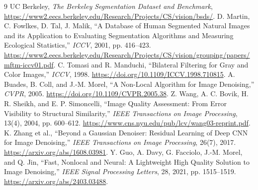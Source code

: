 \documentclass[11pt,a4paper]{article}
\begin{document}
\begin{thebibliography}{9}
\small\setlength{\itemsep}{0pt}\setlength{\parsep}{0pt}
 UC Berkeley, \emph{The Berkeley Segmentation Dataset and Benchmark}, \url{https://www2.eecs.berkeley.edu/Research/Projects/CS/vision/bsds/}.
 D. Martin, C. Fowlkes, D. Tal, J. Malik, ``A Database of Human Segmented Natural Images and its Application to Evaluating Segmentation Algorithms and Measuring Ecological Statistics,'' \emph{ICCV}, 2001, pp. 416--423. \url{https://www2.eecs.berkeley.edu/Research/Projects/CS/vision/grouping/papers/mftm-iccv01.pdf}.
 C. Tomasi and R. Manduchi, ``Bilateral Filtering for Gray and Color Images,'' \emph{ICCV}, 1998. \url{https://doi.org/10.1109/ICCV.1998.710815}.
 A. Buades, B. Coll, and J.-M. Morel, ``A Non-Local Algorithm for Image Denoising,'' \emph{CVPR}, 2005. \url{https://doi.org/10.1109/CVPR.2005.38}.
 Z. Wang, A. C. Bovik, H. R. Sheikh, and E. P. Simoncelli, ``Image Quality Assessment: From Error Visibility to Structural Similarity,'' \emph{IEEE Transactions on Image Processing}, 13(4), 2004, pp. 600--612. \url{https://www.cns.nyu.edu/pub/lcv/wang03-reprint.pdf}.
 K. Zhang et al., ``Beyond a Gaussian Denoiser: Residual Learning of Deep CNN for Image Denoising,'' \emph{IEEE Transactions on Image Processing}, 26(7), 2017. \url{https://arxiv.org/abs/1608.03981}.
 Y. Guo, A. Davy, G. Facciolo, J.-M. Morel, and Q. Jin, ``Fast, Nonlocal and Neural: A Lightweight High Quality Solution to Image Denoising,'' \emph{IEEE Signal Processing Letters}, 28, 2021, pp. 1515--1519. \url{https://arxiv.org/abs/2403.03488}.
\end{thebibliography}
\end{document}
